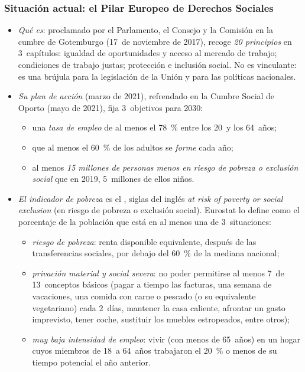 \documentclass[11pt]{article}
\begin{document}
\subsubsection{Situación actual: el Pilar Europeo de Derechos Sociales}\label{sec:pilar}

\begin{itemize}
\item \emph{Qué es}: proclamado por el Parlamento, el Consejo y la Comisión en la cumbre de Gotemburgo (17~de noviembre de 2017), recoge \emph{20 principios} en 3~capítulos: igualdad de oportunidades y acceso al mercado de trabajo; condiciones de trabajo justas; protección e inclusión social. No es vinculante: es una brújula para la legislación de la Unión y para las políticas nacionales.
\item \emph{Su plan de acción} (marzo de 2021), refrendado en la Cumbre Social de Oporto (mayo de 2021), fija 3~objetivos para 2030\nocite{CE2021PlanPilar}:
  \begin{itemize}
  \item una \emph{tasa de empleo} de al menos el 78~\% entre los 20~y los 64~años;
  \item que al menos el 60~\% de los adultos se \emph{forme} cada año;
  \item al menos \emph{15 millones de personas menos en riesgo de pobreza o exclusión social} que en 2019, 5~millones de ellos niños\nocite{CE2021PlanPilar}.
  \end{itemize}
\item \emph{El indicador de pobreza} es el , siglas del inglés \emph{at risk of poverty or social exclusion} (en riesgo de pobreza o exclusión social). Eurostat lo define como el porcentaje de la población que está en al menos una de 3~situaciones\nocite{EurostatGlosarioAROPE}:
  \begin{itemize}
  \item \emph{riesgo de pobreza}: renta disponible equivalente, después de las transferencias sociales, por debajo del 60~\% de la mediana nacional;
  \item \emph{privación material y social severa}: no poder permitirse al menos 7~de 13~conceptos básicos (pagar a tiempo las facturas, una semana de vacaciones, una comida con carne o pescado (o su equivalente vegetariano) cada 2~días, mantener la casa caliente, afrontar un gasto imprevisto, tener coche, sustituir los muebles estropeados, entre otros);
  \item \emph{muy baja intensidad de empleo}: vivir (con menos de 65~años) en un hogar cuyos miembros de 18~a 64~años trabajaron el 20~\% o menos de su tiempo potencial el año anterior.

\end{itemize}
\end{itemize}
\end{document}
